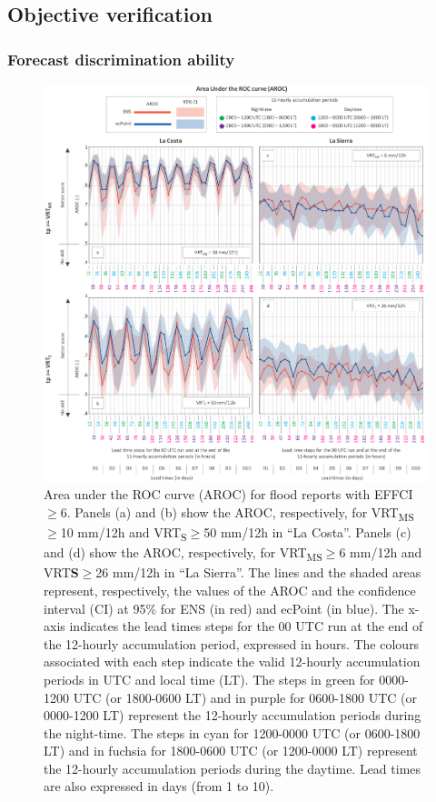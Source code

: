 \documentclass[techmemo]{ecmwfrep}%
\begin{document}
\subsection{Objective verification}
\label{sec:Obj_Verif}

\subsubsection{Forecast discrimination ability}

\begin{figure}
\centering
\includegraphics[width=\textwidth]{Figures/10_RESULTS_AROC.png}
\caption{Area under the ROC curve (AROC) for flood reports with EFFCI$\geq$6. Panels (a) and (b) show the AROC, respectively, for VRT\textsubscript{MS}$\geq$10 mm/12h and VRT\textsubscript{S}$\geq$50 mm/12h in “La Costa”. Panels (c) and (d) show the AROC, respectively, for VRT\textsubscript{MS}$\geq$6 mm/12h and VRT\textbf{S}$\geq$26 mm/12h in “La Sierra”. The lines and the shaded areas represent, respectively, the values of the AROC and the confidence interval (CI) at 95\% for ENS (in red) and ecPoint (in blue). The x-axis indicates the lead times steps for the 00 UTC run at the end of the 12-hourly accumulation period, expressed in hours. The colours associated with each step indicate the valid 12-hourly accumulation periods in UTC and local time (LT). The steps in green for 0000-1200 UTC (or 1800-0600 LT) and in purple for 0600-1800 UTC (or 0000-1200 LT) represent the 12-hourly accumulation periods during the night-time. The steps in cyan for 1200-0000 UTC (or 0600-1800 LT) and in fuchsia for 1800-0600 UTC (or 1200-0000 LT) represent the 12-hourly accumulation periods during the daytime. Lead times are also expressed in days (from 1 to 10).}
\label{fig:AROC}
\end{figure}
\end{document}
